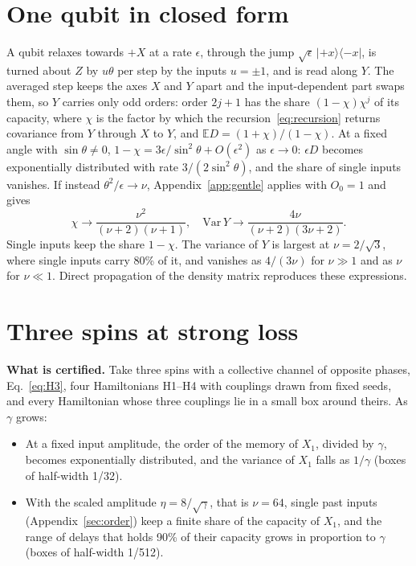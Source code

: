 \section{One qubit in closed form}
\label{app:qubit}
A qubit relaxes towards $+X$ at a rate $\epsilon$, through the jump $\sqrt\epsilon\,|{+x}\rangle\langle{-x}|$, is
turned about $Z$ by $u\theta$ per step by the inputs $u=\pm1$, and is read along $Y$. The averaged step keeps the axes
$X$ and $Y$ apart and the input-dependent part swaps them, so $Y$ carries only odd orders: order $2j+1$ has the share
$(1-\chi)\chi^j$ of its capacity, where $\chi$ is the factor by which the recursion~\eqref{eq:recursion} returns
covariance from $Y$ through $X$ to $Y$, and $\mathbb ED=(1+\chi)/(1-\chi)$. At a fixed angle with
$\sin\theta\neq0$, $1-\chi=3\epsilon/\sin^2\theta+O(\epsilon^2)$ as $\epsilon\to0$: $\epsilon D$ becomes
exponentially distributed with rate $3/(2\sin^2\theta)$, and the share of single inputs vanishes. If instead
$\theta^2/\epsilon\to\nu$, Appendix~\ref{app:gentle} applies with $O_0=1$ and gives
\begin{equation}
  \chi\to\frac{\nu^2}{(\nu+2)(\nu+1)},\quad
  \mathrm{Var}\,Y\to\frac{4\nu}{(\nu+2)(3\nu+2)} .
  \label{eq:qubitlimit}
\end{equation}
Single inputs keep the share $1-\chi$. The variance of $Y$ is largest at $\nu=2/\sqrt3$, where single inputs carry
80\% of it, and vanishes as $4/(3\nu)$ for $\nu\gg1$ and as $\nu$ for $\nu\ll1$. Direct propagation of the density
matrix reproduces these expressions.

\section{Three spins at strong loss}
\label{app:spins}
\begin{keybox}
\textbf{What is certified.} Take three spins with a collective channel of opposite phases, Eq.~\eqref{eq:H3}, four
Hamiltonians H1--H4 with couplings drawn from fixed seeds, and every Hamiltonian whose three couplings lie in a small
box around theirs. As $\gamma$ grows:
\begin{itemize}[leftmargin=*,itemsep=2pt,topsep=4pt]
\item At a fixed input amplitude, the order of the memory of $X_1$, divided by $\gamma$, becomes exponentially
  distributed, and the variance of $X_1$ falls as $1/\gamma$ (boxes of half-width 1/32).
\item With the scaled amplitude $\eta=8/\sqrt\gamma$, that is $\nu=64$, single past inputs
  (Appendix~\ref{sec:order}) keep a finite share of the capacity of $X_1$,
  and the range of delays that holds 90\% of their capacity grows in proportion to $\gamma$ (boxes of half-width 1/512).
\end{itemize}
\end{keybox}

